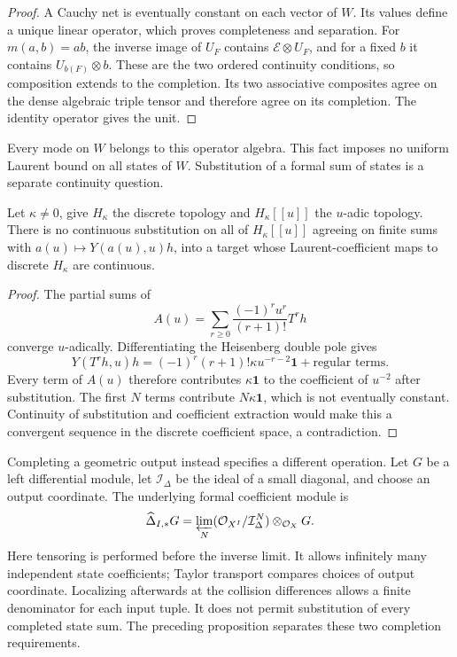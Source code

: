 \begin{proof}
A Cauchy net is eventually constant on each vector
of \(W\). Its values define a unique linear operator,
which proves completeness and separation. For
\(m(a,b)=ab\), the inverse image of \(U_F\) contains
\(\mathcal E\otimes U_F\), and for a fixed \(b\)
it contains \(U_{b(F)}\otimes b\). These are the
two ordered continuity conditions, so composition
extends to the completion. Its two associative
composites agree on the dense algebraic triple
tensor and therefore agree on its completion.
The identity operator gives the unit.
\end{proof}

Every mode on \(W\) belongs to this operator algebra.
This fact imposes no uniform Laurent bound on all
states of \(W\). Substitution of a formal sum of
states is a separate continuity question.

\begin{proposition}\label{e1c:prop:completion}
Let \(\kappa\ne0\), give \(H_\kappa\) the discrete
topology and \(H_\kappa[[u]]\) the \(u\)-adic topology.
There is no continuous substitution on all of
\(H_\kappa[[u]]\) agreeing on finite sums with
\(a(u)\mapsto Y(a(u),u)h\), into a target whose
Laurent-coefficient maps to discrete \(H_\kappa\)
are continuous.
\end{proposition}

\begin{proof}
The partial sums of
\[
 A(u)=\sum_{r\geq0}\frac{(-1)^ru^r}{(r+1)!}T^rh
\]
converge \(u\)-adically. Differentiating the
Heisenberg double pole gives
\[
 Y(T^rh,u)h=(-1)^r(r+1)!\kappa u^{-r-2}\mathbf1
                                  +\text{regular terms}.
\]
Every term of \(A(u)\) therefore contributes
\(\kappa\mathbf1\) to the coefficient of \(u^{-2}\)
after substitution. The first \(N\) terms contribute
\(N\kappa\mathbf1\), which is not eventually
constant. Continuity of substitution and coefficient
extraction would make this a convergent sequence in
the discrete coefficient space, a contradiction.
\end{proof}

Completing\label{e1c:def:formal-diagonal-output} a geometric output instead specifies a
different operation. Let \(G\) be a left differential module,
let \(\mathcal I_\Delta\) be the ideal of a small diagonal,
and choose an output coordinate. The underlying formal
coefficient module is
\[
 \widehat\Delta_{I,*}G
 =\varprojlim_N
       (\mathcal O_{X^I}/\mathcal I_\Delta^N)
                       \otimes_{\mathcal O_X}G.
\]
Here tensoring is performed before the inverse limit.
It allows infinitely many independent state coefficients;
Taylor transport compares choices of output coordinate.
Localizing afterwards at the collision differences
allows a finite denominator for each input tuple.
It does not permit substitution of every completed
state sum. The preceding proposition separates these
two completion requirements.

